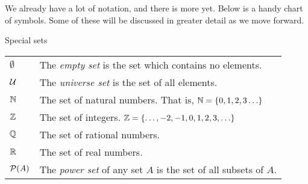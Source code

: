 \documentclass[12pt]{article}
\begin{document}
We already have a lot of notation, and there is more yet.  Below is a handy chart of symbols.  Some of these will be discussed in greater detail as we move forward.

\begin{defbox}{Special sets}

\begin{tabular}{l p{5in}}
  $\emptyset$ & The {\em empty set} is the set which contains no elements.\\[1ex]
  $\mathcal U$ & The {\em universe set} is the set of all elements.\\[1ex]
$\mathbb N$ & The set of natural numbers. That is, $\mathbb N = \{0, 1, 2, 3\ldots\}$ \\[1ex]
$\mathbb Z$ & The set of integers.  $\mathbb Z = \{\ldots, -2, -1, 0, 1, 2, 3, \ldots\}$\\[1ex]
$\mathbb Q$ & The set of rational numbers.\\[1ex]
$\mathbb R$ & The set of real numbers.\\[1ex]
$\mathcal P(A)$ & The {\em power set} of any set $A$ is the set of all subsets of $A$.
\end{tabular}
\end{defbox}

\newpage
\end{document}
